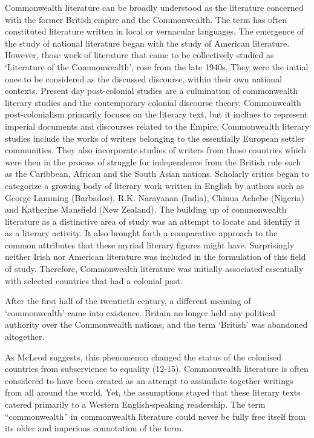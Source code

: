 Commonwealth  literature  can  be  broadly  understood  as  the  literature  concerned  with  the  former  British  empire  and  the  Commonwealth.  The  term  has  often  constituted  literature  written  in  local  or  vernacular  languages.  The  emergence  of  the  study  of  national  literature  began  with  the  study  of  American  literature.  However,  those  work  of  literature  that  came  to  be  collectively  studied  as  ‘Literature  of  the  Commonwealth’,  rose  from  the  late  1940s.  They  were  the  initial  ones  to  be  considered  as  the  discussed  discourse,  within  their  own  national  contexts.  Present  day  post-colonial  studies  are  a  culmination  of  commonwealth  literary  studies  and  the  contemporary  colonial  discourse  theory.  Commonwealth  post-colonialism  primarily  focuses  on  the  literary  text,  but  it  inclines  to  represent  imperial  documents  and  discourses  related  to  the  Empire.  Commonwealth  literary  studies  include  the  works  of  writers  belonging  to  the  essentially  European  settler  communities.  They  also  incorporate  studies  of  writers  from  those  countries  which  were  then  in  the  process  of  struggle  for  independence  from  the  British  rule  such  as  the  Caribbean,  African  and  the  South  Asian  nations.  Scholarly  critics  began  to  categorize  a  growing  body  of  literary  work  written  in  English  by  authors  such  as  George  Lamming  (Barbados),  R.K.  Narayanan  (India),  Chinua  Achebe  (Nigeria)  and  Katherine  Mansfield  (New  Zealand).  The  building  up  of  commonwealth  literature  as  a  distinctive  area  of  study  was  an  attempt  to  locate  and  identify  it  as  a  literary  activity.  It  also  brought  forth  a  comparative  approach  to  the  common  attributes  that  these  myriad  literary  figures  might  have.  Surprisingly  neither  Irish  nor  American  literature  was  included  in  the  formulation  of  this  field  of  study.  Therefore,  Commonwealth  literature  was  initially  associated  essentially  with  selected  countries  that  had  a  colonial  past. 

After  the  first  half  of  the  twentieth  century,  a  different  meaning  of  ‘commonwealth’  came  into  existence.  Britain  no  longer  held  any  political  authority  over  the  Commonwealth  nations,  and  the  term  ‘British’  was  abandoned  altogether.

As  McLeod  suggests,  this  phenomenon  changed  the  status  of  the  colonised  countries  from  subservience  to  equality  (12-15).  Commonwealth  literature  is  often  considered  to  have  been  created  as  an  attempt  to  assimilate  together  writings  from  all  around  the  world.  Yet,  the  assumptions  stayed  that  these  literary  texts  catered  primarily  to  a  Western  English-speaking  readership.  The  term  “commonwealth”  in  commonwealth  literature  could  never  be  fully  free  itself  from  its  older  and  imperious  connotation  of  the  term.  

